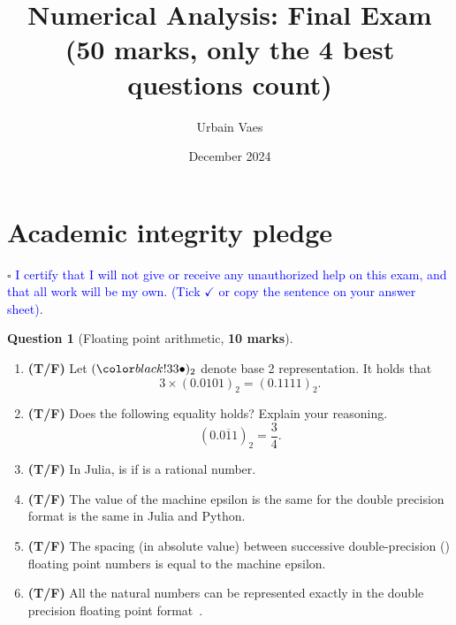 \documentclass[10pt]{article}
\theoremstyle{definition}
\newtheorem{question}{Question}
\theoremstyle{remark}
\theoremstyle{plain}%
\begin{document}
\title{Numerical Analysis: Final Exam \\
\small{(\textbf{50 marks}, only the 4 best questions count)}}
\author{Urbain Vaes}
\date{December 2024}
\maketitle

\section*{Academic integrity pledge}
\noindent $\square$ \textcolor{blue}{I certify that I will not give or receive any unauthorized help on this exam,
and that all work will be my own. (Tick $\checkmark$ or copy the sentence on your answer sheet)}.


\newpage
\begin{question}
    [Floating point arithmetic, \textbf{10 marks}]
    $~$
    \begin{enumerate}
        \item
            \textbf{(T/F)}
            Let $(\placeholder)_2$ denote base 2 representation.
            It holds that
            \[
                3 \times (0.0101)_2 = (0.1111)_2.
            \]

        \item
            \textbf{(T/F)}
            Does the following equality holds? Explain your reasoning.
            \[
                (0.\overline{011})_2 = \frac{3}{4}.
            \]
             \vspace{1.7cm}

        \item
            \textbf{(T/F)}
            In Julia,  is  if  is a rational number.

        \item
            \textbf{(T/F)}
            The value of the machine epsilon is the same for the double precision format is the same in Julia and Python.

        \item
            \textbf{(T/F)}
            The spacing (in absolute value) between successive double-precision () floating point numbers is equal to the machine epsilon.

        \item
            \textbf{(T/F)}
            All the natural numbers can be represented exactly in the double precision floating point format~.


\end{enumerate}
\end{question}
\end{document}
